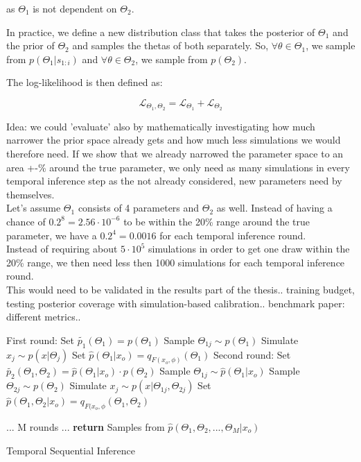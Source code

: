\documentclass[12pt]{report}
\begin{document}
as $\Theta_1$ is not dependent on $\Theta_2$.

In practice, we define a new distribution class that takes the posterior of $\Theta_1$ and the prior of $\Theta_2$ and samples the thetas of both separately. So, $\forall \theta \in \Theta_1$, we sample from $p(\Theta_1|s_{1:i} )$ and $\forall \theta \in \Theta_2$, we sample from $p(\Theta_2)$.

The log-likelihood is then defined as:

$$ \mathcal{L}_{\Theta_1,\Theta_2} = \mathcal{L}_{\Theta_1} + \mathcal{L}_{\Theta_2}$$




Idea: we could 'evaluate' also by mathematically investigating how much narrower the prior space already gets and how much less simulations we would therefore need. If we show that we already narrowed the parameter space to an area +-\% around the true parameter, we only need as many simulations in every temporal inference step as the not already considered, new parameters need by themselves.\\

Let's assume $\Theta_1$ consists of 4 parameters and $\Theta_2$ as well. 
Instead of having a chance of $0.2^8= 2.56 \cdot 10^{-6}$ to be within the 20\% range around the true parameter, we have a $0.2^4  = 0.0016$ for each temporal inference round. \\
Instead of requiring about $5\cdot10^5$ simulations in order to get one draw within the 20\% range, we then need less then 1000 simulations for each temporal inference round.\\


This would need to be validated in the results part of the thesis.. training budget, testing posterior coverage with simulation-based calibration.. benchmark paper: different metrics..


\begin{algorithm}[H]
    First round:\;
	Set $\widetilde{p_1}(\Theta_1)=p(\Theta_1)$\;
	{Sample $\Theta_{1j} \sim p(\Theta_1)$\;
	Simulate $x_j \sim p(x|\Theta_j)$}\;
	Set $\hat{p}(\Theta_1|x_o) = q_{F(x_o,\phi)}(\Theta_1)$ \;
	\;
	Second round:\;
	Set $\widetilde{p_2}(\Theta_1, \Theta_2)=\hat{p}(\Theta_1|x_o) \cdot p(\Theta_2)$\;
	{Sample $\Theta_{1j} \sim \hat{p}(\Theta_1|x_o)$\;
	Sample $\Theta_{2j} \sim p(\Theta_2)$\;
	Simulate $x_j \sim p(x|\Theta_{1j}, \Theta_{2j})$}\;
	Set $\hat{p}(\Theta_1, \Theta_2|x_o) = q_{F(x_o,\phi}(\Theta_1, \Theta_2)$ \;
	
	\;
	... M rounds ...\;
	\textbf{return} Samples from $\hat{p}(\Theta_1, \Theta_2, ..., \Theta_M|x_o)$
	
	
	
	
	
	\caption{Temporal Sequential Inference}
	
\end{algorithm}




\end{document}
